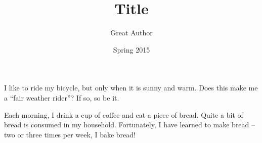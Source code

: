 \documentclass[11pt]{article}
\title{Title}
\author{Great Author}
\date{Spring 2015}
\begin{document}
\maketitle
 
I like to ride my bicycle, but only when it is sunny and warm. 
Does this make me a ``fair weather rider''?
If so, so be it.
 
Each morning, I drink a cup of coffee and eat a piece of bread.
Quite a bit of bread is consumed in my household.
Fortunately, I have learned to make bread -- two or three times per week, I bake bread!


\end{document}
